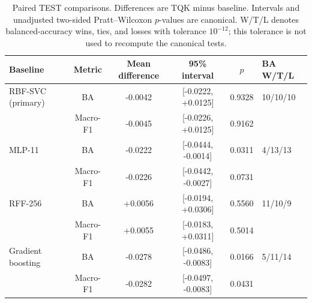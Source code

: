 \begin{table}[t]
\caption{Paired TEST comparisons. Differences are TQK minus baseline. Intervals and unadjusted two-sided Pratt--Wilcoxon $p$-values are canonical. W/T/L denotes balanced-accuracy wins, ties, and losses with tolerance $10^{-12}$; this tolerance is not used to recompute the canonical tests.}
\label{tab:paired-results}
\centering
\small
\setlength{\tabcolsep}{4.5pt}
\begin{tabular}{lccccl}
\toprule
Baseline & Metric & Mean difference & 95\% interval & $p$ & BA W/T/L \\
\midrule
RBF-SVC (primary) & BA & -0.0042 & [-0.0222, +0.0125] & 0.9328 & 10/10/10 \\
 & Macro-F1 & -0.0045 & [-0.0226, +0.0125] & 0.9162 &  \\
\addlinespace[2pt]
MLP-11 & BA & -0.0222 & [-0.0444, -0.0014] & 0.0311 & 4/13/13 \\
 & Macro-F1 & -0.0226 & [-0.0442, -0.0027] & 0.0731 &  \\
\addlinespace[2pt]
RFF-256 & BA & +0.0056 & [-0.0194, +0.0306] & 0.5560 & 11/10/9 \\
 & Macro-F1 & +0.0055 & [-0.0183, +0.0311] & 0.5014 &  \\
\addlinespace[2pt]
Gradient boosting & BA & -0.0278 & [-0.0486, -0.0083] & 0.0166 & 5/11/14 \\
 & Macro-F1 & -0.0282 & [-0.0497, -0.0083] & 0.0431 &  \\
\bottomrule
\end{tabular}
\end{table}
